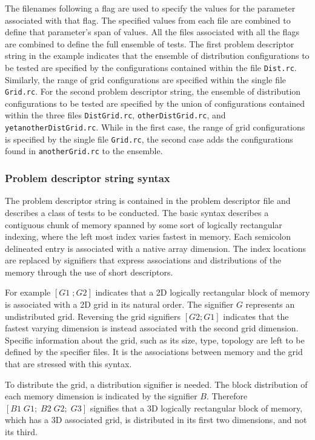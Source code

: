 The filenames following a flag are used to specify the values for the parameter associated with that flag. The specified values from each file are combined to define that parameter's span of values.  All the files associated with all the flags are combined to define the full ensemble of tests. The first problem descriptor string in the example indicates that the ensemble of distribution configurations to be tested are specified by the configurations contained within the file \texttt{Dist.rc}. Similarly, the range of grid configurations are specified within the single file \texttt{Grid.rc}. For the second problem descriptor string, the ensemble of distribution configurations to be tested are specified by the union of configurations contained within the three files \texttt{DistGrid.rc}, \texttt{otherDistGrid.rc}, and \texttt{yetanotherDistGrid.rc}. While in the first case, the range of grid configurations is specified by the single file \texttt{Grid.rc}, the second case adds the configurations found in \texttt{anotherGrid.rc} to the ensemble.


\subsubsection{Problem descriptor string syntax}
The problem descriptor string is contained in the problem descriptor file and describes a class of tests to be conducted. The basic syntax describes a contiguous chunk of memory spanned by some sort of logically rectangular indexing, where the left most index varies fastest in memory. Each semicolon delineated entry is associated with a native array dimension. The index locations are replaced by signifiers that express associations and distributions of the memory through the use of short descriptors. 

For example $[ G1 \; ; G2 ]$ indicates that a 2D logically rectangular block of memory is associated with a 2D grid in its natural order. The signifier $G$ represents an undistributed grid. Reversing the grid signifiers $[ G2; G1 ]$ indicates that the fastest varying dimension is instead associated with the second grid dimension. Specific information about the grid, such as its size, type, topology are left to be defined by the specifier files. It is the associations between memory and the grid that are stressed with this syntax.

To distribute the grid, a distribution signifier is needed. The block distribution of each memory dimension is indicated by the signifier $B$. Therefore $[B1 \; G1; \; B2 \; G2; \; G3]$ signifies that a 3D logically rectangular block of memory, which has a 3D associated grid, is distributed in its first two dimensions, and not its third.

